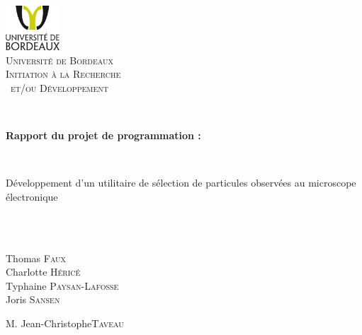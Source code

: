 %

\begin{titlepage}

\begin{center}


\includegraphics[width=0.15\textwidth]{logounibdx.png}\\[1cm]

\textsc{\LARGE Université de Bordeaux}\\[1.5cm]
\vspace*{0.5cm}
\textsc{\Large Initiation à la Recherche\\\ et/ou Développement}\\[0.5cm]

\vspace*{1cm}

\HRule \\[0.3cm]
{ \begin{Huge}
\bfseries Rapport du projet de programmation :
\end{Huge} \\ \begin{huge}
Développement d'un utilitaire de sélection de particules observées au microscope électronique
\end{huge}}\\[0.3cm]

\HRule \\[1.3cm]
\begin{minipage}{0.4\textwidth}
\begin{center} \large
Thomas \textsc{Faux}\\
Charlotte \textsc{Héricé}\\
Typhaine \textsc{Paysan-Lafosse}\\
Joris \textsc{Sansen}\\
\end{center}
\end{minipage}
\begin{minipage}{0.4\textwidth}
\begin{flushright} \large
M. Jean-Christophe\textsc{Taveau}
\end{flushright}
\end{minipage}


\end{center}
\end{titlepage}
